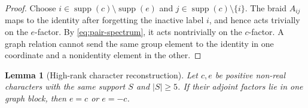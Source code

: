 \documentclass[11pt]{article}
\newtheorem{lemma}[theorem]{Lemma}
\theoremstyle{definition}
\theoremstyle{remark}
\newcommand{\supp}{\operatorname{supp}}
\begin{document}
\begin{proof}
Choose $i\in\supp(c)\setminus\supp(e)$ and
$j\in\supp(c)\setminus\{i\}$.  The braid $A_{ij}$ maps to the identity after forgetting the inactive label $i$, and hence acts trivially on the $e$-factor.  By \eqref{eq:pair-spectrum}, it acts nontrivially on the $c$-factor.  A graph relation cannot send the same group element to the identity in one coordinate and a nonidentity element in the other.
\end{proof}

\begin{lemma}[High-rank character reconstruction]\label{lem:high-rank}
Let $c,e$ be positive non-real characters with the same support $S$ and $|S|\ge5$.  If their adjoint factors lie in one graph block, then $e=c$ or $e=-c$.
\end{lemma}
\end{document}
